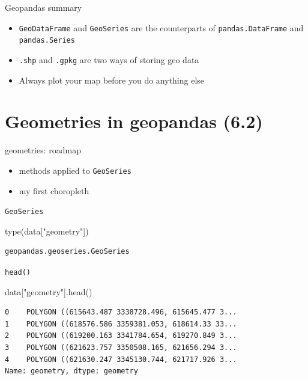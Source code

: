 \documentclass[
  ignorenonframetext,
]{beamer}
\newenvironment{Shaded}{\begin{snugshade}}{\end{snugshade}}
\newcommand{\BuiltInTok}[1]{\textcolor[rgb]{0.00,0.23,0.31}{#1}}
\newcommand{\NormalTok}[1]{\textcolor[rgb]{0.00,0.23,0.31}{#1}}
\newcommand{\StringTok}[1]{\textcolor[rgb]{0.13,0.47,0.30}{#1}}
\providecommand{\tightlist}{%
  \setlength{\itemsep}{0pt}\setlength{\parskip}{0pt}}\usepackage{longtable,booktabs,array}
\begin{document}
\begin{frame}[fragile]{Geopandas summary}
\label{geopandas-summary}
\begin{itemize}
\tightlist
\item
  \texttt{GeoDataFrame} and \texttt{GeoSeries} are the counterparts of
  \texttt{pandas.DataFrame} and \texttt{pandas.Series}
\item
  \texttt{.shp} and \texttt{.gpkg} are two ways of storing geo data
\item
  Always plot your map before you do anything else
\end{itemize}
\end{frame}

\section{Geometries in geopandas
(6.2)}\label{geometries-in-geopandas-6.2}

\begin{frame}[fragile]{geometries: roadmap}
\label{geometries-roadmap}
\begin{itemize}
\tightlist
\item
  methods applied to \texttt{GeoSeries}
\item
  my first choropleth
\end{itemize}
\end{frame}

\begin{frame}[fragile]{\texttt{GeoSeries}}
\label{geoseries}
\begin{Shaded}
\begin{Highlighting}[]
\BuiltInTok{type}\NormalTok{(data[}\StringTok{"geometry"}\NormalTok{])}
\end{Highlighting}
\end{Shaded}

\begin{verbatim}
geopandas.geoseries.GeoSeries
\end{verbatim}
\end{frame}

\begin{frame}[fragile]{\texttt{head()}}
\label{head}
\begin{Shaded}
\begin{Highlighting}[]
\NormalTok{data[}\StringTok{"geometry"}\NormalTok{].head()}
\end{Highlighting}
\end{Shaded}

\begin{verbatim}
0    POLYGON ((615643.487 3338728.496, 615645.477 3...
1    POLYGON ((618576.586 3359381.053, 618614.33 33...
2    POLYGON ((619200.163 3341784.654, 619270.849 3...
3    POLYGON ((621623.757 3350508.165, 621656.294 3...
4    POLYGON ((621630.247 3345130.744, 621717.926 3...
Name: geometry, dtype: geometry
\end{verbatim}
\end{frame}
\end{document}
